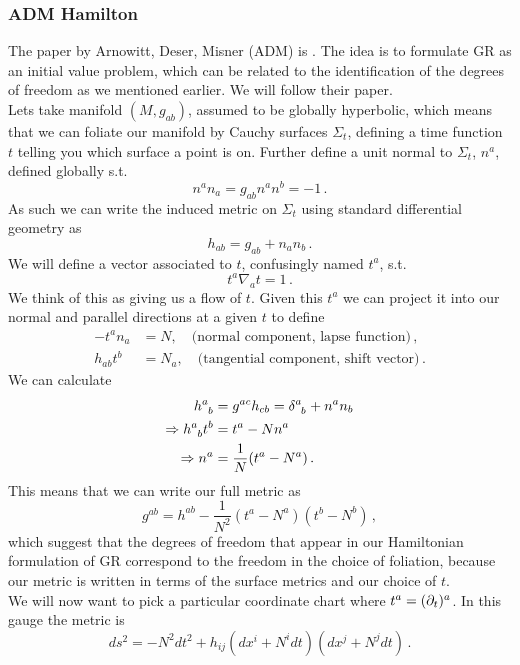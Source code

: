 \documentclass{article}
\begin{document}
\subsubsection{ADM Hamilton}
The paper by Arnowitt, Deser, Misner (ADM) is \cite{Arnowitt2008}. The idea is to formulate GR as an initial value problem, which can be related to the identification of the degrees of freedom as we mentioned earlier. We will follow their paper. \\
Lets take manifold $(M, g_{ab})$, assumed to be globally hyperbolic, which means that we can foliate our manifold by Cauchy surfaces $\Sigma_t$, defining a time function $t$ telling you which surface a point is on. Further define a unit normal to $\Sigma_t$, $n^a$, defined globally s.t. 
\[
n^a n_a = g_{ab} n^a n^b = -1 \, .
\]
As such we can write the induced metric on $\Sigma_t$ using standard differential geometry as 
\[
h_{ab} = g_{ab} + n_a n_b \, . 
\]
We will define a vector associated to $t$, confusingly named $t^a$, s.t. 
\[
t^a \nabla_a t = 1 \, . 
\]
We think of this as giving us a flow of $t$. Given this $t^a$ we can project it into our normal and parallel directions at a given $t$ to define 
\begin{align*}
	-t^a n_a &= N , \quad \text{(normal component, lapse function)}\, ,  \\
	h_{ab} t^b &= N_a, \quad \text{(tangential component, shift vector)} \, . 
\end{align*}
We can calculate 
\begin{align*}
	h\indices{^a_b} &= g^{ac}h_{cb} = \delta\indices{^a_b} + n^a n_b \\ 
	\Rightarrow h\indices{^a_b}t^b &= t^a - Nn^a \\
	\Rightarrow n^a &= \frac{1}{N}(t^a - N^a) \, .
\end{align*}
This means that we can write our full metric as 
\[
g^{ab} = h^{ab} - \frac{1}{N^2}(t^a - N^a)(t^b - N^b) \, ,
\]
which suggest that the degrees of freedom that appear in our Hamiltonian formulation of GR correspond to the freedom in the choice of foliation, because our metric is written in terms of the surface metrics and our choice of $t$. \\
We will now want to pick a particular coordinate chart where $t^a = (\partial_t)^a$. In this gauge the metric is 
\[
ds^2 = -N^2 dt^2 + h_{ij}(dx^i + N^i dt)(dx^j + N^j dt) \, . 
\]
\end{document}
